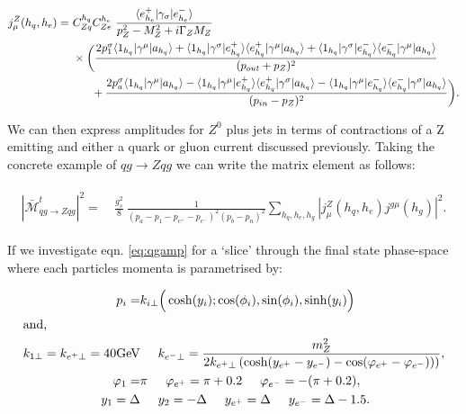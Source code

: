 		\begin{align}
		  \begin{split}
		    j^Z_\mu(h_q, h_e) = &\ C_{Zq}^{h_q}C_{Ze}^{h_e}\ \frac{\bk{e^+_{h_e}}{\gl{\sigma}}{e^-_{h_e}}}{p_Z^2 -
		      M^2_Z + i\Gamma_ZM_Z} \\ &\ \times\bigg(\frac{2p_1^\sigma\bk{1_{h_q}}{\gu{\mu}}{a_{h_q}} +
		      \bk{1_{h_q}}{\gu{\sigma}}{e^+_{h_q}} \bk{e^+_{h_q}}{\gu{\mu}}{a_{h_q}} +
		      \bk{1_{h_q}}{\gu{\sigma}}{e^-_{h_q}} \bk{e^-_{h_q}}{\gu{\mu}}{a_{h_q}}}
		    {(p_{out} + p_Z)^2}\\
		    &\qquad + \frac{ 2p_a^\sigma\bk{1_{h_q}}{\gu{\mu}}{a_{h_q}} -
		      \bk{1_{h_q}}{\gu{\mu}}{e^+_{h_q}} \bk{e^+_{h_q}}{\gu{\sigma}}{a_{h_q}} -
		      \bk{1_{h_q}}{\gu{\mu}}{e^-_{h_q}} \bk{e^-_{h_q}}{\gu{\sigma}}{a_{h_q}}}
		    {(p_{in} - p_Z)^2}\bigg).
		    \label{eq:Zcurrent}
		  \end{split}
		\end{align}

		We can then express amplitudes for $Z^0$ plus jets in terms of contractions of
		a Z emitting and either a quark or gluon current discussed previously.  Taking
		the concrete example of $qg\to Zqg$ we can write the matrix element as follows:

		\begin{align}
		\begin{split}
			{|\bar{\mathcal{M}}_{qg\to Zqg}^{t}|}^2 =& \ \frac{g_s^2}{8}\
			\frac{1}{(p_a-p_1-p_{e^+}-p_{e^-})^2 (p_b-p_n)^2}  \sum_{h_q,h_e,h_g}|
			j^{Z}_\mu(h_q,h_e) j^{g\mu}(h_g)|^2.
		  	\label{eq:qgamp}
		\end{split}
		\end{align}

		If we investigate eqn. \eqref{eq:qgamp} for a `slice' through the final state phase-space
		where each particles momenta is parametrised by:

		\begin{align}
		\begin{split}
			p_i = &k_{i\perp}\Big(\cosh (y_i); \cos (\phi_i), \sin (\phi_i), \sinh (y_i)\Big) \\
			\intertext{and,}
			k_{1\perp} = k_{e^+\perp} = 40\mbox{GeV}& \hspace{0.5cm} k_{e^-\perp} =
			\frac{m_Z^2}{2k_{e^+\perp}\left(\cosh(y_{e^+} - y_{e^-}) -
			    \cos(\varphi_{e^+} - \varphi_{e^-}))\right)}, \\
			\varphi_{1} =& \pi \hspace{0.5cm} \varphi_{e^+} = \pi + 0.2 \hspace{0.5cm}
			\varphi_{e^-} = -(\pi + 0.2), \\
			y_1=\Delta& \hspace{0.5cm} y_2=-\Delta \hspace{0.5cm} y_{e^+} = \Delta
			\hspace{0.5cm} y_{e^-} = \Delta - 1.5.
			\label{eq:momenta}
		\end{split}
		\end{align}

